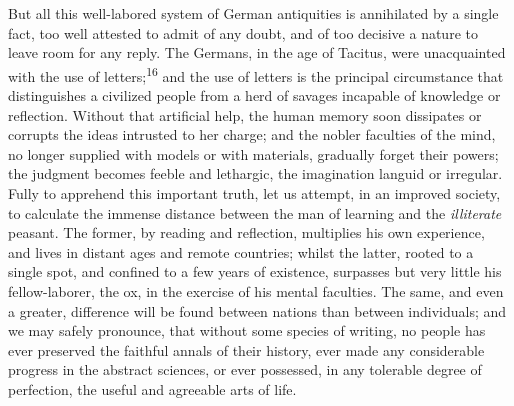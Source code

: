 

But all this well-labored system of German antiquities is
annihilated by a single fact, too well attested to admit of any
doubt, and of too decisive a nature to leave room for any reply.
The Germans, in the age of Tacitus, were unacquainted with the
use of letters;\textsuperscript{16} and the use of letters is the principal
circumstance that distinguishes a civilized people from a herd of
savages incapable of knowledge or reflection. Without that
artificial help, the human memory soon dissipates or corrupts the
ideas intrusted to her charge; and the nobler faculties of the
mind, no longer supplied with models or with materials, gradually
forget their powers; the judgment becomes feeble and lethargic,
the imagination languid or irregular. Fully to apprehend this
important truth, let us attempt, in an improved society, to
calculate the immense distance between the man of learning and
the \textit{illiterate} peasant. The former, by reading and reflection,
multiplies his own experience, and lives in distant ages and
remote countries; whilst the latter, rooted to a single spot, and
confined to a few years of existence, surpasses but very little
his fellow-laborer, the ox, in the exercise of his mental
faculties. The same, and even a greater, difference will be found
between nations than between individuals; and we may safely
pronounce, that without some species of writing, no people has
ever preserved the faithful annals of their history, ever made
any considerable progress in the abstract sciences, or ever
possessed, in any tolerable degree of perfection, the useful and
agreeable arts of life.

